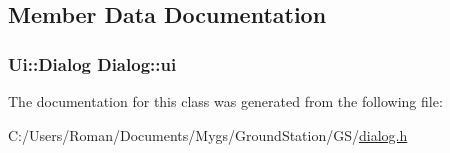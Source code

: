 \subsection{Member Data Documentation}
\hypertarget{class_dialog_a62c4186c0cf571547612cf1ad40dfada}{}
\subsubsection[{ui}]{\setlength{\rightskip}{0pt plus 5cm}Ui\+::\+Dialog Dialog\+::ui}\label{class_dialog_a62c4186c0cf571547612cf1ad40dfada}


The documentation for this class was generated from the following file\+:\begin{DoxyCompactItemize}
\item 
C\+:/\+Users/\+Roman/\+Documents/\+Mygs/\+Ground\+Station/\+G\+S/\hyperlink{dialog_8h}{dialog.\+h}\end{DoxyCompactItemize}
